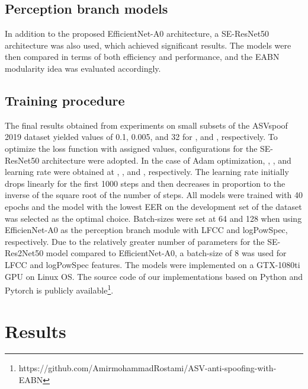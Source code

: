 \documentclass[a4paper]{article}
\begin{document}
\subsection{Perception branch models}
In addition to the proposed EfficientNet-A0 architecture, a SE-ResNet50 architecture was also used, which achieved significant results. The models were then compared in terms of both efficiency and performance, and the EABN modularity idea was evaluated accordingly.
\subsection{Training procedure}
The final results obtained from experiments on small subsets of the ASVspoof 2019 dataset yielded values of 0.1, 0.005, and 32 for ,  and , respectively. To optimize the loss function with assigned values, configurations for the SE-ResNet50 architecture were adopted. In the case of Adam optimization, , , and learning rate were obtained at , , and , respectively. The learning rate initially drops linearly for the first 1000 steps and then decreases in proportion to the inverse of the square root of the number of steps. All models were trained with 40 epochs and the model with the lowest EER on the development set of the dataset was selected as the optimal choice. Batch-sizes were set at 64 and 128 when using EfficienNet-A0 as the perception branch module with LFCC and logPowSpec, respectively. Due to the relatively greater number of parameters for the SE-Res2Net50 model compared to EfficientNet-A0, a batch-size of 8 was used for LFCC and logPowSpec features. The models were implemented on a GTX-1080ti GPU on Linux OS. The source code of our implementations based on Python and Pytorch is publicly available\footnote{https://github.com/AmirmohammadRostami/ASV-anti-spoofing-with-EABN}.
\section{Results}
\end{document}
